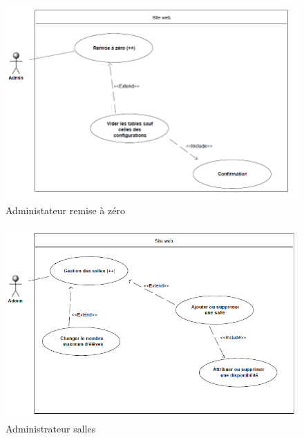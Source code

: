     \begin{figure}[h]
        \begin{center}
            \includegraphics[scale=0.70]{images/uml/adminRAZ.png} 
        \end{center}

        \caption{Administateur remise à zéro}
        \label{Administateur remise à zéro}
    \end{figure}

    \begin{figure}[h]
        \begin{center}
            \includegraphics[scale=0.70]{images/uml/adminSalles.png} 
        \end{center}

        \caption{Administrateur salles}
        \label{Administrateur salles}
    \end{figure}

